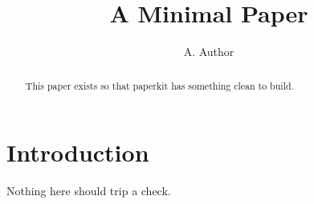 \documentclass{article}
\title{A Minimal Paper}
\author{A. Author}
\begin{document}
\maketitle

\begin{abstract}
  This paper exists so that paperkit has something clean to build.
\end{abstract}

\section{Introduction}

Nothing here should trip a check.
\end{document}
